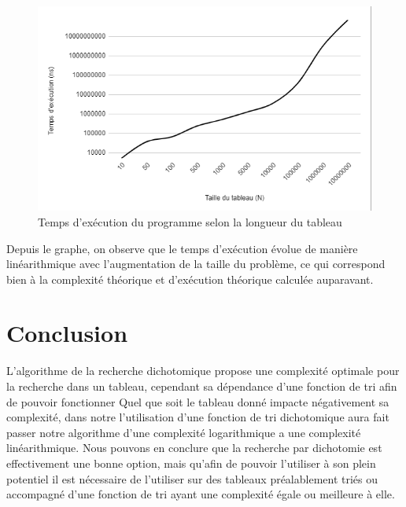 \begin{figure}[H]
    \centering
        \includegraphics[scale=0.55]{./ressources/tempsexecutiondico.png}
        \caption{Temps d'exécution du programme selon la longueur du tableau}
    \label{fig:temps_exec_dico}
\end{figure}

\par
Depuis le graphe,  on observe que le temps d'exécution évolue de manière linéarithmique avec l'augmentation de la taille du problème, ce qui correspond bien à la complexité théorique et d’exécution théorique calculée auparavant. 

\section{Conclusion}
L'algorithme de la recherche dichotomique propose une complexité optimale pour la recherche dans un tableau, cependant sa dépendance d'une fonction de tri afin de pouvoir fonctionner Quel que soit le tableau donné impacte négativement sa complexité, dans notre l'utilisation d'une fonction de tri dichotomique aura fait passer notre algorithme d'une complexité logarithmique a une complexité linéarithmique. Nous pouvons en conclure que la recherche par dichotomie est effectivement une bonne option, mais qu'afin de pouvoir l'utiliser à son plein potentiel il est nécessaire de l'utiliser sur des tableaux préalablement triés ou accompagné d'une fonction de tri ayant une complexité égale ou meilleure à elle.
